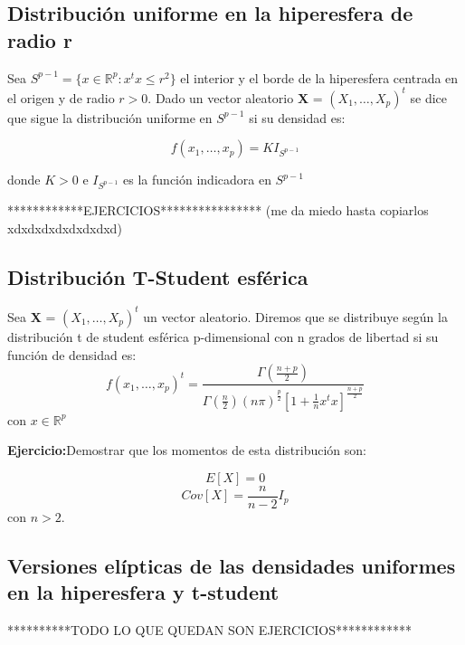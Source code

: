 \documentclass{article}
\theoremstyle{theorem-style}  %
\theoremstyle{definition}
\theoremstyle{example-style}
\begin{document}
	\subsection{Distribución uniforme en la hiperesfera de radio r}
	
	Sea $S^{p-1} = \{x \in \mathbb{R}^p: x^tx\leq r^2\}$ el interior y el borde de la hiperesfera centrada en el origen y de radio $r>0$. Dado un vector aleatorio \textbf{X} = $(X_1, \dots , X_p)^t$ se dice que sigue la distribución uniforme en $S^{p-1}$ si su densidad es:
	
	$$f(x_1, \dots, x_p)= KI_{S^{p-1}}$$
	
	donde $K>0$ e $I_{S^{p-1}}$ es la función indicadora en $ S^{p-1}$
	
	************EJERCICIOS**************** (me da miedo hasta copiarlos xdxdxdxdxdxdxdxd)
	
	\subsection{Distribución T-Student esférica}
	
	Sea \textbf{X} = $(X_1, \dots , X_p)^t$ un vector aleatorio. Diremos que se distribuye según la distribución t de student esférica p-dimensional con n grados de libertad si su función de densidad es:
	$$ f(x_1, \dots, x_p)^t = \frac{\Gamma(\frac{n+p}{2})}{\Gamma(\frac{n}{2})(n \pi )^{\frac{p}{2}}[1+\frac{1}{n}x^tx]^{\frac{n+p}{2}}} $$ con $x \in \mathbb{R}^p$
	
	\textbf{Ejercicio:}Demostrar que los momentos de esta distribución son:
	
	$$ E[X]=0$$ $$ Cov[X]= \frac{n}{n-2}I_{p}$$ con $n>2$. 
	
	\subsection{Versiones elípticas de las densidades uniformes en la hiperesfera y t-student}
	
	**********TODO LO QUE QUEDAN SON EJERCICIOS************
	
\end{document}
